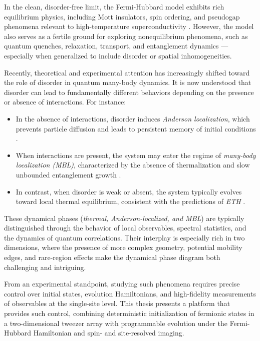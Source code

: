 In the clean, disorder-free limit, the Fermi-Hubbard model exhibits rich equilibrium physics, including Mott insulators, spin ordering, and pseudogap phenomena relevant to high-temperature superconductivity \cite{esslinger_fermi-hubbard_2010}. However, the model also serves as a fertile ground for exploring nonequilibrium phenomena, such as quantum quenches, relaxation, transport, and entanglement dynamics — especially when generalized to include disorder or spatial inhomogeneities.

Recently, theoretical and experimental attention has increasingly shifted toward the role of disorder in quantum many-body dynamics. It is now understood that disorder can lead to fundamentally different behaviors depending on the presence or absence of interactions. For instance:
\begin{itemize}
	\item In the absence of interactions, disorder induces \textit{Anderson localization}, which prevents particle diffusion and leads to persistent memory of initial conditions \cite{anderson_absence_1958}.
	\item When interactions are present, the system may enter the regime of \textit{many-body localization (MBL)}, characterized by the absence of thermalization and slow unbounded entanglement growth \cite{basko_metalinsulator_2006,nandkishore_many-body_2015}.
	\item In contrast, when disorder is weak or absent, the system typically evolves toward local thermal equilibrium, consistent with the predictions of \textit{ETH} \cite{deutsch_quantum_1991,srednicki_chaos_1994}. 
\end{itemize}

These dynamical phases (\emph{thermal, Anderson-localized, and MBL}) are typically distinguished through the behavior of local observables, spectral statistics, and the dynamics of quantum correlations. Their interplay is especially rich in two dimensions, where the presence of more complex geometry, potential mobility edges, and rare-region effects make the dynamical phase diagram both challenging and intriguing.

From an experimental standpoint, studying such phenomena requires precise control over initial states, evolution Hamiltonians, and high-fidelity measurements of observables at the single-site level. This thesis presents a platform that provides such control, combining deterministic initialization of fermionic states in a two-dimensional tweezer array with programmable evolution under the Fermi-Hubbard Hamiltonian and spin- and site-resolved imaging.

